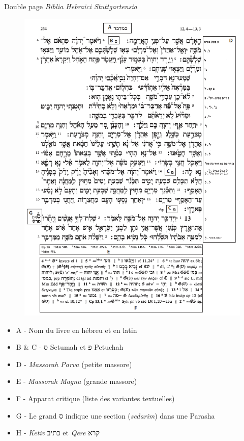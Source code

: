 \documentclass[11pt]{beamer}
\begin{document}
\begin{frame}{Double page \textit{Biblia Hebraici Stuttgartensia}}
\begin{minipage}{.45\textwidth}
    \begin{figure}
        \centering
        \includegraphics[width=1\linewidth]{img/BHSverso.png}
    \end{figure}
\end{minipage}
\hfill
\begin{minipage}{.45\textwidth}
\begin{block}{}
\footnotesize{
\begin{itemize}
    \item A - Nom du livre en hébreu et en latin
    \item B \& C - \texthebrew{ס} Setumah et \texthebrew{פ} Petuchah 
    \item D - \textit{Massorah Parva} (petite massore)
    \item E - \textit{Massorah Magna} (grande massore)
    \item F - Apparat critique (liste des variantes textuelles)
    \item G - Le grand \texthebrew{ס} indique une section (\textit{sedarim}) dans une Parasha
    \item H - \textit{Ketiv} \texthebrew{כתיב} et \textit{Qere} \texthebrew{קרא}
\end{itemize}
}
\end{block}
\end{minipage}
\end{frame}
\end{document}
